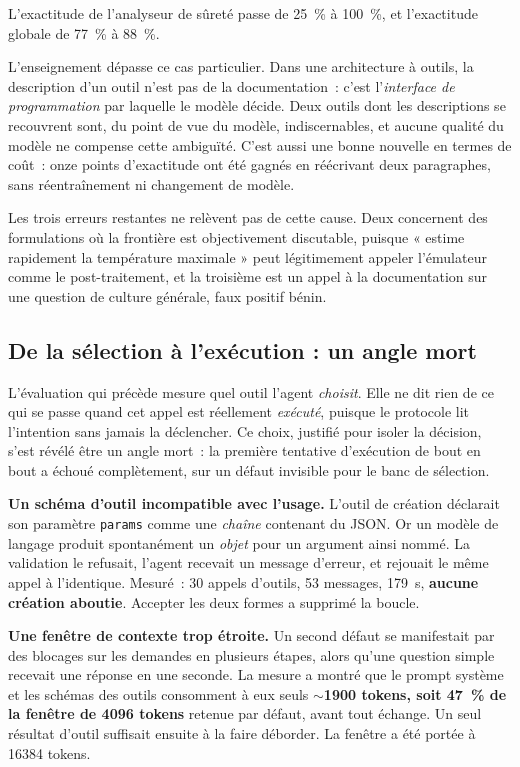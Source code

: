 \documentclass[12pt,a4paper,french]{report}
\begin{document}
L'exactitude de l'analyseur de sûreté passe de \SI{25}{\percent} à
\SI{100}{\percent}, et l'exactitude globale de \SI{77}{\percent} à
\SI{88}{\percent}.

L'enseignement dépasse ce cas particulier. Dans une architecture à outils, la
description d'un outil n'est pas de la documentation~: c'est l'\emph{interface
de programmation} par laquelle le modèle décide. Deux outils dont les
descriptions se recouvrent sont, du point de vue du modèle, indiscernables, et aucune qualité du modèle ne compense cette ambiguïté. C'est aussi une bonne
nouvelle en termes de coût~: onze points d'exactitude ont été gagnés en
réécrivant deux paragraphes, sans réentraînement ni changement de modèle.

Les trois erreurs restantes ne relèvent pas de cette cause. Deux concernent des
formulations où la frontière est objectivement discutable, puisque « estime rapidement
la température maximale » peut légitimement appeler l'émulateur comme le
post-traitement, et la troisième est un appel à la documentation sur une
question de culture générale, faux positif bénin.

\subsection{De la sélection à l'exécution : un angle mort}
\label{sec:angle-mort}

L'évaluation qui précède mesure quel outil l'agent \emph{choisit}. Elle ne dit
rien de ce qui se passe quand cet appel est réellement \emph{exécuté}, puisque
le protocole lit l'intention sans jamais la déclencher. Ce choix, justifié pour
isoler la décision, s'est révélé être un angle mort~: la première tentative
d'exécution de bout en bout a échoué complètement, sur un défaut invisible pour
le banc de sélection.

\textbf{Un schéma d'outil incompatible avec l'usage.} L'outil de création
déclarait son paramètre \texttt{params} comme une \emph{chaîne} contenant du
JSON. Or un modèle de langage produit spontanément un \emph{objet} pour un
argument ainsi nommé. La validation le refusait, l'agent recevait un message
d'erreur, et rejouait le même appel à l'identique. Mesuré~: \num{30} appels
d'outils, \num{53} messages, \SI{179}{\second}, \textbf{aucune création aboutie}.
Accepter les deux formes a supprimé la boucle.

\textbf{Une fenêtre de contexte trop étroite.} Un second défaut se manifestait
par des blocages sur les demandes en plusieurs étapes, alors qu'une question
simple recevait une réponse en une seconde. La mesure a montré que le prompt
système et les schémas des outils consomment à eux seuls
\textbf{$\sim$\num{1900} tokens, soit \SI{47}{\percent} de la fenêtre de
\num{4096} tokens} retenue par défaut, avant tout échange. Un seul résultat
d'outil suffisait ensuite à la faire déborder. La fenêtre a été portée à
\num{16384} tokens.
\end{document}
